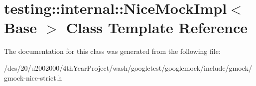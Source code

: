 \hypertarget{classtesting_1_1internal_1_1NiceMockImpl}{}\section{testing\+:\+:internal\+:\+:Nice\+Mock\+Impl$<$ Base $>$ Class Template Reference}
\label{classtesting_1_1internal_1_1NiceMockImpl}


The documentation for this class was generated from the following file\+:\begin{DoxyCompactItemize}
\item 
/dcs/20/u2002000/4th\+Year\+Project/wash/googletest/googlemock/include/gmock/gmock-\/nice-\/strict.\+h\end{DoxyCompactItemize}
